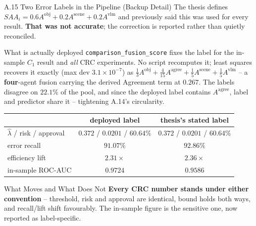 \documentclass[aspectratio=169,11pt]{beamer}
\begin{document}
\begin{frame}{A.15 Two Error Labels in the Pipeline (Backup Detail)}
\footnotesize
\scriptsize The thesis defines $SAA_i = 0.6A^{\text{obj}} + 0.2A^{\text{scene}} + 0.2A^{\text{vlm}}$ and previously said this was used for every result. \textbf{That was not accurate}; the correction is reported rather than quietly reconciled.

\begin{block}{\scriptsize What is actually deployed}
\tiny \texttt{comparison\_fusion\_score} fixes the label for the in-sample $C_1$ result and \emph{all} CRC experiments. No script recomputes it; least squares recovers it exactly (max dev $3.1\times10^{-7}$) as $\tfrac{1}{3}A^{\text{obj}} + \tfrac{4}{15}A^{\text{agree}} + \tfrac{1}{5}A^{\text{scene}} + \tfrac{1}{5}A^{\text{vlm}}$ -- a \textbf{four}-agent fusion carrying the derived Agreement term at $0.267$. The labels disagree on $22.1\%$ of the pool, and since the deployed label contains $A^{\text{agree}}$, label and predictor share it -- tightening A.14's circularity.
\end{block}

\begin{center}\scriptsize
\begin{tabular}{lcc}
\toprule
 & \textbf{deployed label} & \textbf{thesis's stated label} \\
\midrule
$\hat\lambda$ / risk / approval & $0.372$ / $0.0201$ / $60.64\%$ & $0.372$ / $0.0201$ / $60.64\%$ \\
error recall & $91.07\%$ & $92.86\%$ \\
efficiency lift & $2.31\times$ & $2.36\times$ \\
\midrule
in-sample ROC-AUC & $\mathbf{0.9724}$ & $\mathbf{0.9586}$ \\
\bottomrule
\end{tabular}
\end{center}

\vskip 0.1cm
\begin{alertblock}{\scriptsize What Moves and What Does Not}
\tiny \textbf{Every CRC number stands under either convention} -- threshold, risk and approval are identical, bound holds both ways, and recall/lift shift favourably. The in-sample figure is the sensitive one, now reported as label-specific.
\end{alertblock}
\end{frame}
\end{document}
